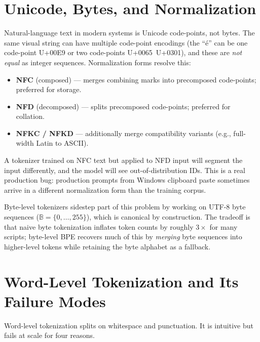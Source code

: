 \section{Unicode, Bytes, and Normalization}

Natural-language text in modern systems is Unicode code-points, not
bytes. The same visual string can have multiple code-point encodings
(the ``\'e'' can be one code-point U+00E9 or two code-points
U+0065~U+0301), and these are \emph{not equal} as integer sequences.
Normalization forms resolve this:
\begin{itemize}
  \item \textbf{NFC} (composed) — merges combining marks into
        precomposed code-points; preferred for storage.
  \item \textbf{NFD} (decomposed) — splits precomposed code-points;
        preferred for collation.
  \item \textbf{NFKC / NFKD} — additionally merge compatibility
        variants (e.g., full-width Latin to ASCII).
\end{itemize}
A tokenizer trained on NFC text but applied to NFD input will segment
the input differently, and the model will see out-of-distribution IDs.
This is a real production bug: production prompts from Windows clipboard
paste sometimes arrive in a different normalization form than the
training corpus.

Byte-level tokenizers sidestep part of this problem by working on UTF-8
byte sequences ($\mathbb{B} = \{0, \ldots, 255\}$), which is canonical
by construction. The tradeoff is that naive byte tokenization inflates
token counts by roughly $3\times$ for many scripts; byte-level BPE
recovers much of this by \emph{merging} byte sequences into higher-level
tokens while retaining the byte alphabet as a fallback.

\section{Word-Level Tokenization and Its Failure Modes}

Word-level tokenization splits on whitespace and punctuation. It is
intuitive but fails at scale for four reasons.

